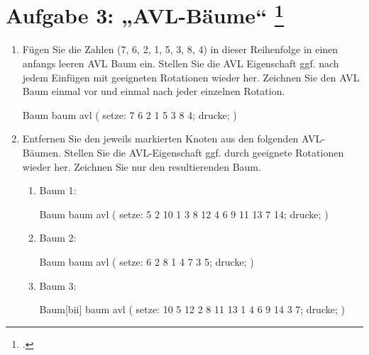 \documentclass{lehramt-informatik-aufgabe}
\begin{document}
\liAufgabenTitel{}
\section{Aufgabe 3: „AVL-Bäume“
\footcite{examen:66115:2014:03}}

\begin{enumerate}


\item Fügen Sie die Zahlen (7, 6, 2, 1, 5, 3, 8, 4) in dieser
Reihenfolge in einen anfangs leeren AVL Baum ein. Stellen Sie die AVL
Eigenschaft ggf. nach jedem Einfügen mit geeigneten Rotationen wieder
her. Zeichnen Sie den AVL Baum einmal vor und einmal nach jeder
einzelnen Rotation.

\begin{liProjektSprache}{Baum}
baum avl (
  setze: 7 6 2 1 5 3 8 4;
  drucke;
)
\end{liProjektSprache}


\item Entfernen Sie den jeweils markierten Knoten aus den folgenden
AVL-Bäumen. Stellen Sie die AVL-Eigenschaft ggf. durch geeignete
Rotationen wieder her. Zeichnen Sie nur den resultierenden Baum.

\begin{enumerate}


\item Baum 1:

\begin{liProjektSprache}{Baum}
baum avl (
  setze: 5 2 10 1 3 8 12 4 6 9 11 13 7 14;
  drucke;
)
\end{liProjektSprache}


\item Baum 2:

\begin{liProjektSprache}{Baum}
baum avl (
  setze: 6 2 8 1 4 7 3 5;
  drucke;
)
\end{liProjektSprache}


\item Baum 3:

\begin{liProjektSprache}{Baum}[bii]
baum avl (
  setze: 10 5 12 2 8 11 13 1 4 6 9 14 3 7;
  drucke;
)
\end{liProjektSprache}


\end{enumerate}
\end{enumerate}
\end{document}
